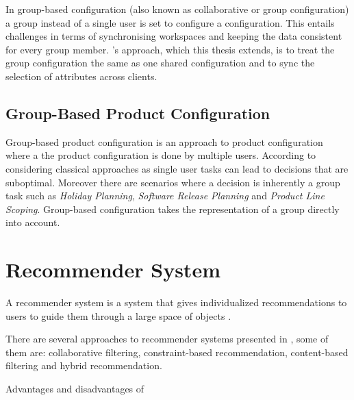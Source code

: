 In group-based configuration (also known as collaborative or group configuration) a group instead of a single user is set to configure a configuration. This entails challenges in terms of synchronising  workspaces and keeping the data consistent for every group member. \citeauthor{raabKollaborativeProduktkonfigurationEchtzeit2019}'s \cite{raabKollaborativeProduktkonfigurationEchtzeit2019} approach, which this thesis extends, is to treat the group configuration the same as one shared configuration and to sync the selection of attributes across clients.

\subsection{Group-Based Product Configuration}
\label{sec:Foundations:GroupBasedProductConfiguration}

Group-based product configuration is an approach to product configuration where a the product configuration is done by multiple users. According to \citeauthor{felferningGroupBasedConfiguration2016} \cite{felferningGroupBasedConfiguration2016} considering classical approaches as single user tasks can lead to decisions that are suboptimal. Moreover there are scenarios where a decision is inherently a group task such as \emph{Holiday Planning}, \emph{Software Release Planning} and \emph{Product Line Scoping}. Group-based configuration takes the representation of a group directly into account.

\section{Recommender System}
\label{sec:Foundations:RecommenderSystem}

A recommender system is a system that gives individualized recommendations to users to guide them through a large space of objects \cite[~ p. 331]{burkeHybridRecommenderSystems2002}.

There are several approaches to recommender systems presented in \cite{felfernigGroupRecommenderSystems2018}, some of them are: collaborative filtering, constraint-based recommendation, content-based filtering and hybrid recommendation.

Advantages and disadvantages of 

